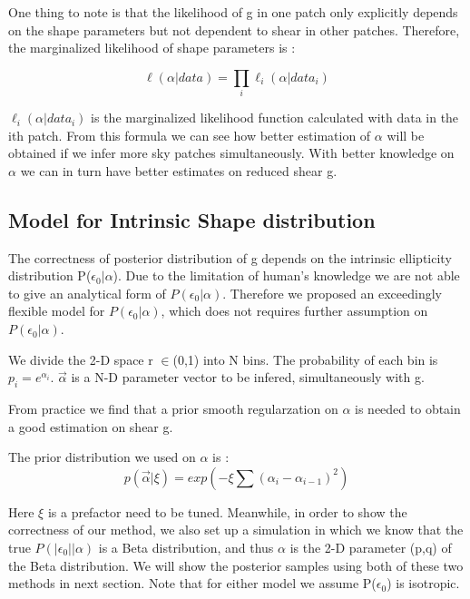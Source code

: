 \documentclass[useAMS,usenatbib]{mn2e}
\begin{document}
One thing to note is that the likelihood of g in one patch only explicitly depends
on the shape parameters but not dependent to shear in other patches. Therefore, the
marginalized likelihood of shape parameters is :

\begin{equation}
\ell(\alpha|data)=\prod_{i}\ell_{i}(\alpha|data_{i})
\end{equation}


$\ell_{i}(\alpha|data_{i})$ is the marginalized likelihood function
calculated with data in the ith patch. From this formula we can see
how better estimation of $\alpha$ will be obtained if we infer more
sky patches simultaneously. With better knowledge on $\alpha$ we
can in turn have better estimates on reduced shear g.


\subsection{Model for Intrinsic Shape distribution}

The correctness of posterior distribution of g depends on the intrinsic
ellipticity distribution P($\epsilon_{0}|\alpha$). Due to the limitation
of human's knowledge we are not able to give an analytical form of
$P(\epsilon_{0}|\alpha)$. Therefore we proposed an exceedingly flexible
model for $P(\epsilon_{0}|\alpha)$, which does not requires further
assumption on $P(\epsilon_{0}|\alpha)$.

We divide the 2-D space r $\in$(0,1) into N bins. The probability
of each bin is $p_{i}=e^{\alpha_{i}}$. $\overrightarrow{\alpha}$
is a N-D parameter vector to be infered, simultaneously with g.

From practice we find that a prior smooth regularzation on $\alpha$
is needed to obtain a good estimation on shear g.

The prior distribution we used on $\alpha$ is : 
\begin{equation}
p(\vec{\alpha}|\xi)=exp(-\xi\sum(\alpha_{i}-\alpha_{i-1})^{2})
\end{equation}

Here $\xi$ is a prefactor need to be tuned.
Meanwhile, in order to show the correctness of our method, we also
set up a simulation in which we know that the true $P(|\epsilon_{0}||\alpha)$
is a Beta distribution, and thus $\alpha$ is the 2-D parameter (p,q)
of the Beta distribution. We will show the posterior samples using
both of these two methods in next section. Note that for either model
we assume P($\epsilon_{0}$) is isotropic.
\end{document}
